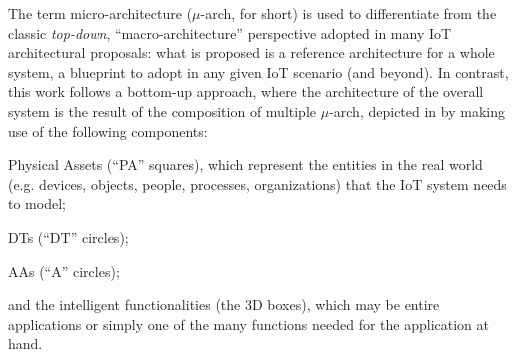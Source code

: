 The term micro-architecture ($\mu$-arch, for short)  is used to differentiate from the classic \emph{top-down}, ``macro-architecture'' perspective adopted in many \ac{IoT} architectural proposals: what is proposed is a reference architecture for a whole system, a blueprint to adopt in any given IoT scenario (and beyond).
%
%
In contrast, this work follows a bottom-up approach, where the architecture of the overall system is the result of the composition of multiple $\mu$-arch, depicted in by making use of the following components: 
\begin{inlinelist}
\item 
Physical Assets (``PA'' squares), which represent the entities in the real world (e.g. devices, objects, people, processes, organizations) that the IoT system needs to model; 
\item 
DTs (``DT'' circles); 
\item 
AAs (``A'' circles); 
\item 
and the intelligent functionalities (the 3D boxes), which may be entire applications or simply one of the many functions needed for the application at hand. 
\end{inlinelist}


